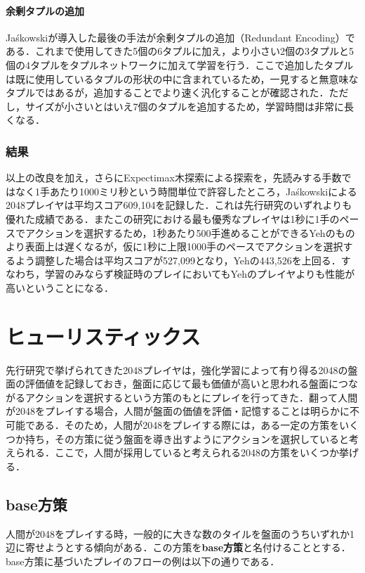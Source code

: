 \documentclass{suribt}
\begin{document}
\subsubsection{余剰タプルの追加}
Ja\'{s}kowskiが導入した最後の手法が余剰タプルの追加（Redundant Encoding）である．これまで使用してきた5個の6タプルに加え，より小さい2個の3タプルと5個の4タプルをタプルネットワークに加えて学習を行う．ここで追加したタプルは既に使用しているタプルの形状の中に含まれているため，一見すると無意味なタプルではあるが，追加することでより速く汎化することが確認された．ただし，サイズが小さいとはいえ7個のタプルを追加するため，学習時間は非常に長くなる．

\subsection{結果}
以上の改良を加え，さらにExpectimax木探索による探索を，先読みする手数ではなく1手あたり1000ミリ秒という時間単位で許容したところ，Ja\'{s}kowskiによる2048プレイヤは平均スコア609,104を記録した．これは先行研究のいずれよりも優れた成績である．またこの研究における最も優秀なプレイヤは1秒に1手のペースでアクションを選択するため，1秒あたり500手進めることができるYehのものより表面上は遅くなるが，仮に1秒に上限1000手のペースでアクションを選択するよう調整した場合は平均スコアが527,099となり，Yehの443,526を上回る．すなわち，学習のみならず検証時のプレイにおいてもYehのプレイヤよりも性能が高いということになる．

\chapter{ヒューリスティックス}
先行研究で挙げられてきた2048プレイヤは，強化学習によって有り得る2048の盤面の評価値を記録しておき，盤面に応じて最も価値が高いと思われる盤面につながるアクションを選択するという方策のもとにプレイを行ってきた．翻って人間が2048をプレイする場合，人間が盤面の価値を評価・記憶することは明らかに不可能である．そのため，人間が2048をプレイする際には，ある一定の方策をいくつか持ち，その方策に従う盤面を導き出すようにアクションを選択していると考えられる．ここで，人間が採用していると考えられる2048の方策をいくつか挙げる．

\section{base方策}
人間が2048をプレイする時，一般的に大きな数のタイルを盤面のうちいずれか1辺に寄せようとする傾向がある．この方策を\textbf{base方策}と名付けることとする．base方策に基づいたプレイのフローの例は以下の通りである．
\end{document}
